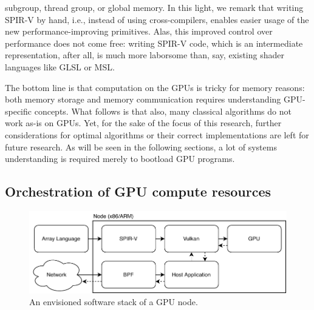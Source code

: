 \documentclass{IEEEtran}
\begin{document}
subgroup, thread group, or global memory. In this light, we remark that writing SPIR-V by hand, i.e., instead of using cross-compilers, enables easier usage of the new performance-improving primitives. Alas, this improved control over performance does not come free: writing SPIR-V code, which is an intermediate representation, after all, is much more laborsome than, say, existing shader languages like \gls{GLSL} or \gls{MSL}.

The bottom line is that computation on the GPUs is tricky for memory reasons: both memory storage and memory communication requires understanding GPU-specific concepts. What follows is that also, many classical algorithms do not work as-is on GPUs. Yet, for the sake of the focus of this research, further considerations for optimal algorithms or their correct implementations are left for future research. As will be seen in the following sections, a lot of systems understanding is required merely to bootload GPU programs.

\subsection{Orchestration of GPU compute resources}
\label{ch:sysarch}

\begin{figure}
  \centering
  \includegraphics[width=\columnwidth]{./assets/system.pdf}
  \caption{An envisioned software stack of a GPU node.}
  \label{fig:system}
\end{figure}
\end{document}
